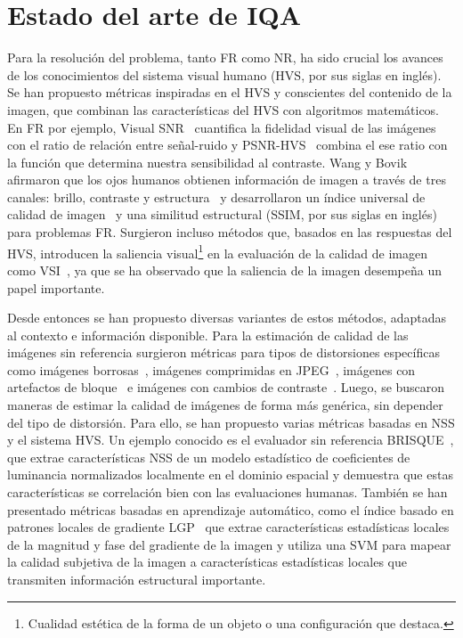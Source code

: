\section{Estado del arte de IQA}
Para la resolución del problema, tanto FR como NR, ha sido crucial los avances de los conocimientos 
del sistema visual humano (HVS, por sus siglas en inglés). Se han propuesto métricas inspiradas en el HVS y 
conscientes del contenido de la imagen, que combinan las características del HVS 
con algoritmos matemáticos. En FR por ejemplo, Visual SNR~\cite{VSNR} cuantifica 
la fidelidad visual de las imágenes con el ratio de relación entre señal-ruido y 
PSNR-HVS~\cite{PSNR-HVS} combina el ese ratio con la función que determina 
nuestra sensibilidad al contraste. 
Wang y Bovik afirmaron que los ojos humanos obtienen información de imagen a 
través de tres canales: brillo, contraste y estructura~\cite{SSIM} y desarrollaron 
un índice universal de calidad de imagen~\cite{UQI} y una similitud 
estructural (SSIM, por sus siglas en inglés)~\cite{SSIM} para problemas FR. Surgieron incluso métodos que, basados en las 
respuestas del HVS, introducen la saliencia visual\footnote{
  Cualidad estética de la forma de un objeto o una configuración que destaca.
} en la evaluación de la calidad de imagen como VSI~\cite{VSI}, 
ya que se ha observado que la saliencia de la imagen desempeña un papel importante.

Desde entonces se han propuesto diversas variantes de estos métodos, adaptadas 
al contexto e información disponible. 
Para la estimación de calidad de las imágenes sin referencia surgieron métricas para 
tipos de distorsiones específicas como 
imágenes borrosas~\cite{GradientBasedBlurAssessment}, 
imágenes comprimidas en JPEG~\cite{JPEGBasedOnLuminance}, 
imágenes con artefactos de bloque~\cite{DeblockedImages} e imágenes con 
cambios de contraste~\cite{ContrastDistorted}.
Luego, se buscaron maneras de estimar la calidad de imágenes de forma más genérica, 
sin depender del tipo de distorsión. Para ello, se han propuesto varias métricas 
basadas en NSS y el sistema HVS. 
Un ejemplo conocido es el evaluador sin referencia BRISQUE~\cite{BRISQUE}, que extrae 
características NSS de un modelo estadístico de coeficientes de luminancia 
normalizados localmente en el dominio espacial y demuestra que estas características 
se correlación bien con las evaluaciones humanas.
También se han presentado métricas basadas en aprendizaje automático, 
como el índice basado en patrones locales de gradiente LGP~\cite{LGP} que extrae 
características estadísticas locales de la magnitud y fase del gradiente de la imagen y utiliza una 
SVM para mapear la calidad subjetiva de la imagen a 
características estadísticas locales que transmiten información estructural importante.

